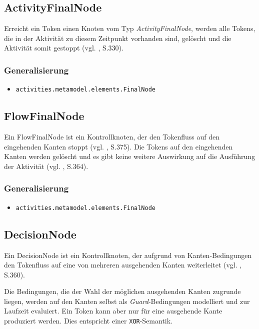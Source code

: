 \subsection{ActivityFinalNode}
\label{meta-activityfinal}
Erreicht ein Token einen Knoten vom Typ \emph{ActivityFinalNode}, werden alle Tokens, die in der Aktivität zu diesem Zeitpunkt vorhanden sind, gelöscht und die Aktivität somit gestoppt  (vgl. \citep{OMG2009}, S.330).

\subsubsection{Generalisierung}
\begin{itemize}
\item \texttt{activities.metamodel.elements.FinalNode}
\end{itemize}


\subsection{FlowFinalNode}
\label{meta-flowfinal}
Ein FlowFinalNode ist ein Kontrollknoten, der den Tokenfluss auf den eingehenden Kanten stoppt (vgl. \citep{OMG2009}, S.375). Die Tokens auf den eingehenden Kanten werden gelöscht und es gibt keine weitere Auswirkung auf die Ausführung der Aktivität (vgl. \citep{RumbaughJacobsonBooch2005}, S.364).

\subsubsection{Generalisierung}
\begin{itemize}
\item \texttt{activities.metamodel.elements.FinalNode}
\end{itemize}


\subsection{DecisionNode}
\label{meta-decision}
Ein DecisionNode ist ein Kontrollknoten, der aufgrund von Kanten-Bedingungen den Tokenfluss auf eine von mehreren ausgehenden Kanten weiterleitet (vgl. \citep{OMG2009}, S.360).

Die Bedingungen, die der Wahl der möglichen ausgehenden Kanten zugrunde liegen, werden auf den Kanten selbst als \emph{Guard}-Bedingungen modelliert und zur Laufzeit evaluiert. Ein Token kann aber nur für eine ausgehende Kante produziert werden. Dies entspricht einer \texttt{XOR}-Semantik.

